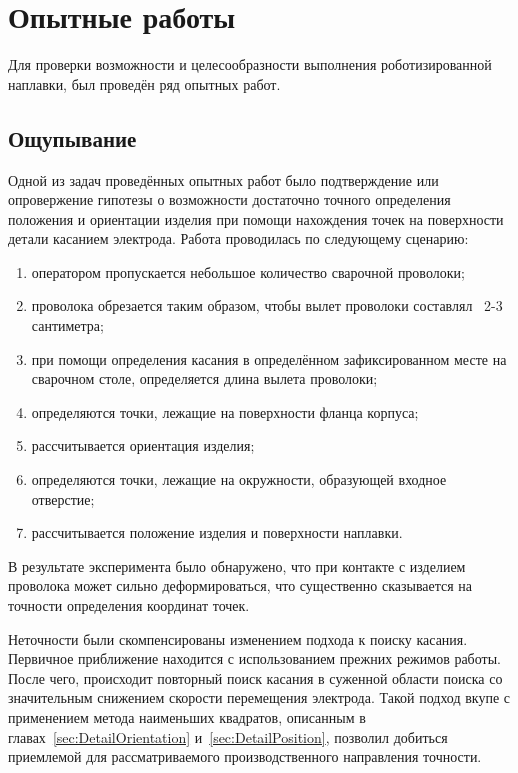 \chapter{Опытные работы}
Для проверки возможности и целесообразности выполнения роботизированной наплавки, был проведён ряд опытных работ.


\section{Ощупывание}
Одной из задач проведённых опытных работ было подтверждение или опровержение гипотезы о возможности достаточно точного определения положения и ориентации изделия при помощи нахождения точек на поверхности детали касанием электрода.
Работа проводилась по следующему сценарию:

\begin{enumerate}
    \item оператором пропускается небольшое количество сварочной проволоки;
    \item проволока обрезается таким образом, чтобы вылет проволоки составлял ~2-3 сантиметра;
    \item при помощи определения касания в определённом зафиксированном месте на сварочном столе, определяется длина вылета проволоки;
    \item определяются точки, лежащие на поверхности фланца корпуса;
    \item рассчитывается ориентация изделия;
    \item определяются точки, лежащие на окружности, образующей входное отверстие;
    \item рассчитывается положение изделия и поверхности наплавки.
\end{enumerate}

В результате эксперимента было обнаружено, что при контакте с изделием проволока может сильно деформироваться, что существенно сказывается на точности определения координат точек.

Неточности были скомпенсированы изменением подхода к поиску касания.
Первичное приближение находится с использованием прежних режимов работы.
После чего, происходит повторный поиск касания в суженной области поиска со значительным снижением скорости перемещения электрода.
Такой подход вкупе с применением метода наименьших квадратов, описанным в главах~\ref{sec:DetailOrientation} и~\ref{sec:DetailPosition}, позволил добиться приемлемой для рассматриваемого производственного направления точности.


